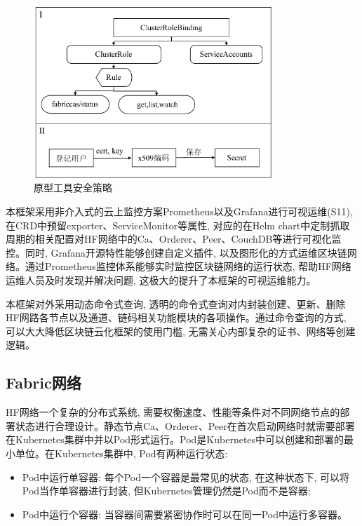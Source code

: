 \begin{figure}[h] %
    \centering %
    \includegraphics[width=0.8\textwidth]{FIGs/chapter4/safety.pdf} %
    \caption{原型工具安全策略} %
    \label{safety} %
\end{figure}%


本框架采用非介入式的云上监控方案Prometheus以及Grafana进行可视运维(S11), 在CRD中预留exporter、ServiceMonitor等属性, 对应的在Helm chart中定制抓取周期的相关配置对HF网络中的Ca、Orderer、Peer、CouchDB等进行可视化监控。同时, Grafana开源特性能够创建自定义插件, 以及图形化的方式运维区块链网络。通过Prometheus监控体系能够实时监控区块链网络的运行状态, 帮助HF网络运维人员及时发现并解决问题, 这极大的提升了本框架的可视运维能力。

本框架对外采用动态命令式查询, 透明的命令式查询对内封装创建、更新、删除HF网路各节点以及通道、链码相关功能模块的各项操作。通过命令查询的方式, 可以大大降低区块链云化框架的使用门槛, 无需关心内部复杂的证书、网络等创建逻辑。

\subsection{Fabric网络}

HF网络一个复杂的分布式系统, 需要权衡速度、性能等条件对不同网络节点的部署状态进行合理设计。静态节点Ca、Orderer、Peer在首次启动网络时就需要部署在Kubernetes集群中并以Pod形式运行。Pod是Kubernetes中可以创建和部署的最小单位。在Kubernetes集群中, Pod有两种运行状态:

\begin{itemize}[itemindent=2em]
    \item Pod中运行单容器: 每个Pod一个容器是最常见的状态, 在这种状态下, 可以将Pod当作单容器进行封装, 但Kubernetes管理仍然是Pod而不是容器;

    \item Pod中运行个容器: 当容器间需要紧密协作时可以在同一Pod中运行多容器。
\end{itemize}

